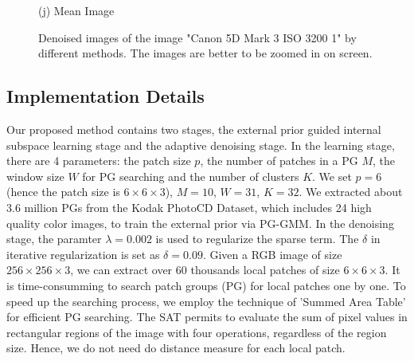\documentclass[10pt,twocolumn,letterpaper]{article}
\begin{document}
\begin{figure}
{\begin{minipage}[t]{0.195\textwidth}
{\footnotesize (j) Mean Image}
\end{minipage}
}
\caption{Denoised images of the image "Canon 5D Mark 3 ISO 3200 1" by different methods. The images are better to be zoomed in on screen.}
\label{fig5}
\end{figure}

\subsection{Implementation Details}
Our proposed method contains two stages, the external prior guided internal subspace learning stage and the adaptive denoising stage. In the learning stage, there are 4 parameters: the patch size $p$, the number of patches in a PG $M$, the window size $W$ for PG searching and the number of clusters $K$. We set $p = 6$ (hence the patch size is $6\times 6 \times 3$), $M=10$, $W = 31$, $K=32$. We extracted about 3.6 million PGs from the Kodak PhotoCD Dataset, which includes 24 high quality color images, to train the external prior via PG-GMM. In the denoising stage, the paramter $\lambda = 0.002$ is used to regularize the sparse term. The $\delta$ in iterative regularization is set as $\delta = 0.09$. Given a RGB image of size $256\times256\times3$, we can extract over 60 thousands local patches of size $6\times6\times3$. It is time-consumming to search patch groups (PG) for local patches one by one. To speed up the searching process, we employ the technique of 'Summed Area Table' \cite{sat} for efficient PG searching. The SAT permits to evaluate the sum of pixel values in rectangular regions of the image with four operations, regardless of the region size. Hence, we do not need do distance measure for each local patch.
\end{document}
